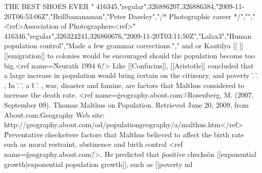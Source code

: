 {  THE BEST SHOES EVER "
416345,"regular",326886207,326886384,"2009-11-20T06:53:06Z","Brillbananaman","Peter Dazeley","/* Photographic career */","","\"<ref>Association of Photographers<ref>\" "
416346,"regular",326324241,326860676,"2009-11-20T03:11:50Z","Lalax3","Human
population control","Made a few grammar corrections."," and or  Kautilya [[ ]]
[[emigration]] to colonies would be encouraged should the population become too
big.<ref name=\"Neurath 1994 6\"/> Like [[Confucius]], [[Aristotle]] concluded
that a large increase in population would bring \"certain  on the citizenry,
and poverty  \". \". , In \". \", a  \"t \". , war, disaster and famine, are
factors that Malthus considered to increase the death rate. <ref
name=\"geography.about.com\">Rosenberg, M. (2007, September 09). Thomas Malthus
on Population. Retrieved June 20, 2009, from About.com:Geography Web site:
http://geography.about.com/od/populationgeography/a/malthus.htm</ref>
\"Preventative checks\" were factors that Malthus believed to affect the birth
rate such as moral restraint, abstinence and birth control <ref
name=\"geography.about.com\"/>. He predicted that \"positive checks\" on
[[exponential growth|exponential population growth]], such as [[poverty nd
}

